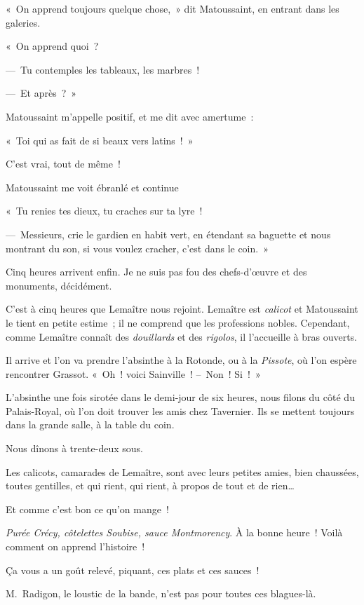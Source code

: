 \documentclass[french,twoside]{book} %
\begin{document}
« On apprend toujours quelque chose, » dit Matoussaint, en entrant dans les galeries.\par
« On apprend quoi ?\par
— Tu contemples les tableaux, les marbres !\par
— Et après ? »\par
Matoussaint m’appelle positif, et me dit avec amertume :\par
« Toi qui as fait de si beaux vers latins ! »\par
C’est vrai, tout de même !\par
Matoussaint me voit ébranlé et continue\par
« Tu renies tes dieux, tu craches sur ta lyre !\par
— Messieurs, crie le gardien en habit vert, en étendant sa baguette et nous montrant du son, si vous voulez cracher, c’est dans le coin. »\par
Cinq heures arrivent enfin. Je ne suis pas fou des chefs-d’œuvre et des monuments, décidément.\par
\bigbreak
\noindent C’est à cinq heures que Lemaître nous rejoint. Lemaître est \emph{calicot} et Matoussaint le tient en petite estime ; il ne comprend que les professions nobles. Cependant, comme Lemaître connaît des \emph{douillards} et des\emph{ rigolos}, il l’accueille à bras ouverts.\par
Il arrive et l’on va prendre l’absinthe à la Rotonde, ou à la \emph{Pissote}, où l’on espère rencontrer Grassot. « Oh ! voici Sainville ! – Non ! Si ! »\par
L’absinthe une fois sirotée dans le demi-jour de six heures, nous filons du côté du Palais-Royal, où l’on doit trouver les amis chez Tavernier. Ils se mettent toujours dans la grande salle, à la table du coin.\par
Nous dînons à trente-deux sous.\par
Les calicots, camarades de Lemaître, sont avec leurs petites amies, bien chaussées, toutes gentilles, et qui rient, qui rient, à propos de tout et de rien…\par
\bigbreak
\noindent Et comme c’est bon ce qu’on mange !\par
\emph{Purée Crécy, côtelettes Soubise, sauce Montmorency}. À la bonne heure ! Voilà comment on apprend l’histoire !\par
Ça vous a un goût relevé, piquant, ces plats et ces sauces !\par
M. Radigon, le loustic de la bande, n’est pas pour toutes ces blagues-là.\par
\end{document}
